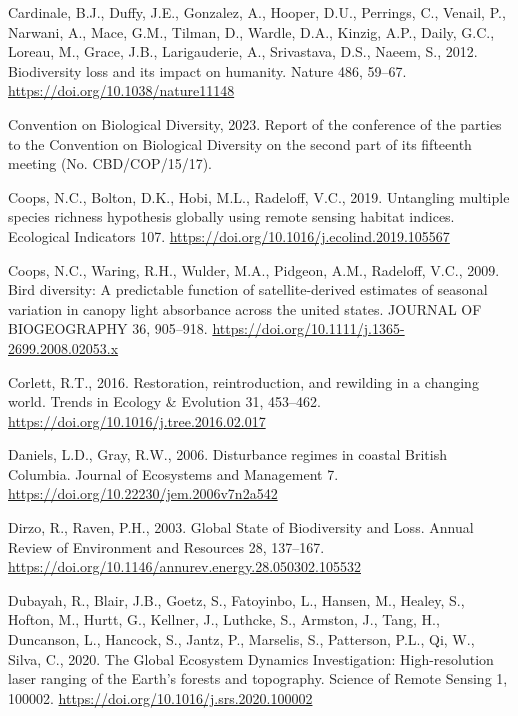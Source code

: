 \documentclass[
]{agujournal2019}
\newlength{\cslhangindent}
\newenvironment{CSLReferences}[2] %
 {\begin{list}{}{%
  \setlength{\itemindent}{0pt}
  \setlength{\leftmargin}{0pt}
  \setlength{\parsep}{0pt}
  \ifodd #1
   \setlength{\leftmargin}{\cslhangindent}
   \setlength{\itemindent}{-1\cslhangindent}
  \fi
  \setlength{\itemsep}{#2\baselineskip}}}
 {\end{list}}
\begin{document}
\begin{CSLReferences}{1}{0}
Cardinale, B.J., Duffy, J.E., Gonzalez, A., Hooper, D.U., Perrings, C.,
Venail, P., Narwani, A., Mace, G.M., Tilman, D., Wardle, D.A., Kinzig,
A.P., Daily, G.C., Loreau, M., Grace, J.B., Larigauderie, A.,
Srivastava, D.S., Naeem, S., 2012. Biodiversity loss and its impact on
humanity. Nature 486, 59--67. \url{https://doi.org/10.1038/nature11148}

Convention on Biological Diversity, 2023. Report of the conference of
the parties to the {Convention} on {Biological Diversity} on the second
part of its fifteenth meeting (No. CBD/COP/15/17).

Coops, N.C., Bolton, D.K., Hobi, M.L., Radeloff, V.C., 2019. Untangling
multiple species richness hypothesis globally using remote sensing
habitat indices. Ecological Indicators 107.
\url{https://doi.org/10.1016/j.ecolind.2019.105567}

Coops, N.C., Waring, R.H., Wulder, M.A., Pidgeon, A.M., Radeloff, V.C.,
2009. Bird diversity: A predictable function of satellite-derived
estimates of seasonal variation in canopy light absorbance across the
united states. JOURNAL OF BIOGEOGRAPHY 36, 905--918.
\url{https://doi.org/10.1111/j.1365-2699.2008.02053.x}

Corlett, R.T., 2016. Restoration, reintroduction, and rewilding in a
changing world. Trends in Ecology \& Evolution 31, 453--462.
\url{https://doi.org/10.1016/j.tree.2016.02.017}

Daniels, L.D., Gray, R.W., 2006. Disturbance regimes in coastal British
Columbia. Journal of Ecosystems and Management 7.
\url{https://doi.org/10.22230/jem.2006v7n2a542}

Dirzo, R., Raven, P.H., 2003. Global State of Biodiversity and Loss.
Annual Review of Environment and Resources 28, 137--167.
\url{https://doi.org/10.1146/annurev.energy.28.050302.105532}

Dubayah, R., Blair, J.B., Goetz, S., Fatoyinbo, L., Hansen, M., Healey,
S., Hofton, M., Hurtt, G., Kellner, J., Luthcke, S., Armston, J., Tang,
H., Duncanson, L., Hancock, S., Jantz, P., Marselis, S., Patterson,
P.L., Qi, W., Silva, C., 2020. The Global Ecosystem Dynamics
Investigation: High-resolution laser ranging of the Earth{'}s forests
and topography. Science of Remote Sensing 1, 100002.
\url{https://doi.org/10.1016/j.srs.2020.100002}


\end{CSLReferences}
\end{document}
